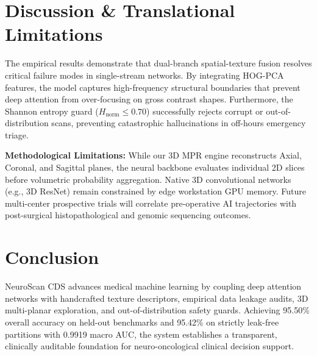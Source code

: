 \documentclass[journal,twocolumn,10pt]{IEEEtran}
\begin{document}
\section{Discussion \& Translational Limitations}
The empirical results demonstrate that dual-branch spatial-texture fusion resolves critical failure modes in single-stream networks. By integrating HOG-PCA features, the model captures high-frequency structural boundaries that prevent deep attention from over-focusing on gross contrast shapes. Furthermore, the Shannon entropy guard ($H_{\text{norm}} \le 0.70$) successfully rejects corrupt or out-of-distribution scans, preventing catastrophic hallucinations in off-hours emergency triage.

\textbf{Methodological Limitations:} While our 3D MPR engine reconstructs Axial, Coronal, and Sagittal planes, the neural backbone evaluates individual 2D slices before volumetric probability aggregation. Native 3D convolutional networks (e.g., 3D ResNet) remain constrained by edge workstation GPU memory. Future multi-center prospective trials will correlate pre-operative AI trajectories with post-surgical histopathological and genomic sequencing outcomes.

\section{Conclusion}
NeuroScan CDS advances medical machine learning by coupling deep attention networks with handcrafted texture descriptors, empirical data leakage audits, 3D multi-planar exploration, and out-of-distribution safety guards. Achieving 95.50\% overall accuracy on held-out benchmarks and 95.42\% on strictly leak-free partitions with 0.9919 macro AUC, the system establishes a transparent, clinically auditable foundation for neuro-oncological clinical decision support.
\end{document}
